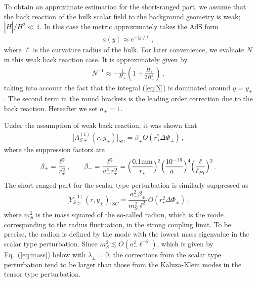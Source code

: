\documentclass[a4paper,showpacs,preprintnumbers,amsmath,amssymb]{revtex4}
\begin{document}
To obtain an approximate estimation for the short-ranged part, we assume that the back reaction of the bulk scalar field to the background geometry is weak; 
${|\dot H|}/{H^2}  \ll 1$.
In this case the metric approximately takes the AdS form 
\begin{eqnarray}
   a (y) \approx e^{-|y|/\ell}  \,,
\label{eq: a=exp}
\end{eqnarray}
where $\ell$ is the curvature radius of the bulk. 
For later convenience, we evaluate $N$ in this weak back reaction case. It is approximately given by 
\begin{eqnarray}
   N^{-1} \approx -  \frac{1}{H_+} 
  \left( 1 + \frac{\dot H_+}{2H_+^2} \right) \,,
\label{eq:Ninv}
\end{eqnarray}
taking into account the fact that the integral (\ref{eq:N}) is dominated around $y=y_+$. The second term in the round brackets is the leading order correction due to the back reaction. 
Hereafter we set $a_{+}=1$. 


Under the assumption of weak back reaction, it was shown that 
\cite{Tanaka:2000er,Kudoh:2001kz}
\begin{eqnarray}
 \bigl[  A_{S\pm}^{(1)}(r,y_\pm)  \bigr]_{SC} =
\beta_\pm   O(r_\star^2 \Delta \Phi_\pm) \,,
\label{eq:A - KK corr}
\end{eqnarray}
where the suppression factors are 
\begin{eqnarray}
   \beta_+ = \frac{\ell^2}{r_\star^2}\,, \quad\quad
   \beta_- = \frac{\ell^2}{a^4_-  r_\star^2} 
    =\Bigl( \frac{ 0.1 {\mathrm{mm}} }{r_\star} \Bigr)^2
    \Bigl( \frac{ 10^{-16} }{a_-}  \Bigr)^4
    \Bigl( \frac{ \ell}{\ell_{Pl}}  \Bigr)^2\,.
\label{eq:suppres factor 1}
\end{eqnarray}
The short-ranged part for the scalar type perturbation is similarly suppressed as 
\begin{equation}
 \bigl[  Y_{S\pm}^{(1)}(r,y_\pm)  \bigr]_{SC} =
 \frac{a_-^2\beta_\pm}{m_S^2\ell^2} 
 O(r_\star^2 \Delta \Phi_\pm) \,,  
\end{equation}
where $m_S^2$ is the mass squared of the so-called radion, which is the mode corresponding to the radius fluctuation, in the strong coupling limit. 
To be precise, the radion is defined by the mode with the lowest mass eigenvalue in the scalar type perturbation. 
Since $m_S^2 \lesssim  O(a_-^2 \ell^{-2})$, which is given by 
Eq.~(\ref{eq:mass}) below with $\lambda_\pm=0$, the corrections from the scalar type perturbation tend to be larger than those from the Kaluza-Klein modes in the tensor type perturbation. 
\end{document}
